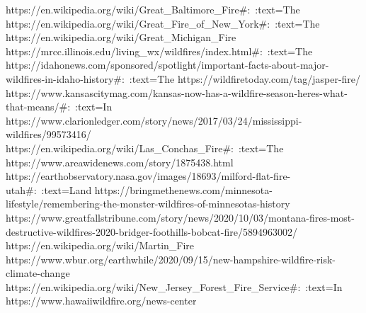 \documentclass[fontsize=11pt]{article}
\begin{document}
https://en.wikipedia.org/wiki/Great\_Baltimore\_Fire#:~:text=The%
\newline
https://en.wikipedia.org/wiki/Great\_Fire\_of\_New\_York#:~:text=The%
\newline
https://en.wikipedia.org/wiki/Great\_Michigan\_Fire
\newline
https://mrcc.illinois.edu/living\_wx/wildfires/index.html#:~:text=The%
\newline
https://idahonews.com/sponsored/spotlight/important-facts-about-major-wildfires-in-idaho-history#:~:text=The%
\newline
https://wildfiretoday.com/tag/jasper-fire/
\newline
https://www.kansascitymag.com/kansas-now-has-a-wildfire-season-heres-what-that-means/#:~:text=In%
\newline
https://www.clarionledger.com/story/news/2017/03/24/mississippi-wildfires/99573416/
\newline
https://en.wikipedia.org/wiki/Las\_Conchas\_Fire#:~:text=The%
\newline
https://www.areawidenews.com/story/1875438.html
\newline
https://earthobservatory.nasa.gov/images/18693/milford-flat-fire-utah#:~:text=Land%
\newline
https://bringmethenews.com/minnesota-lifestyle/remembering-the-monster-wildfires-of-minnesotas-history
\newline
https://www.greatfallstribune.com/story/news/2020/10/03/montana-fires-most-destructive-wildfires-2020-bridger-foothills-bobcat-fire/5894963002/
\newline
https://en.wikipedia.org/wiki/Martin\_Fire
\newline
https://www.wbur.org/earthwhile/2020/09/15/new-hampshire-wildfire-risk-climate-change
\newline
https://en.wikipedia.org/wiki/New\_Jersey\_Forest\_Fire\_Service#:~:text=In%
\newline
https://www.hawaiiwildfire.org/news-center
\end{document}
